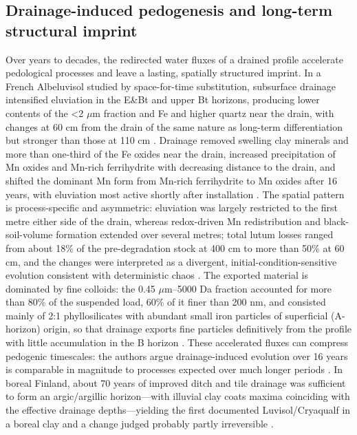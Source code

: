 \documentclass[11pt]{article}
\begin{document}
\subsection{Drainage-induced pedogenesis and long-term structural imprint}

Over years to decades, the redirected water fluxes of a drained profile accelerate
pedological processes and leave a lasting, spatially structured imprint. In a French
Albeluvisol studied by space-for-time substitution, subsurface drainage intensified
eluviation in the E\&Bt and upper Bt horizons, producing lower contents of the
\textless 2 $\mu$m fraction and Fe and higher quartz near the drain, with changes at
60 cm from the drain of the same nature as long-term differentiation but stronger than
those at 110 cm \parencite{Montagne2010}. Drainage removed swelling clay minerals and
more than one-third of the Fe oxides near the drain, increased precipitation of Mn
oxides and Mn-rich ferrihydrite with decreasing distance to the drain, and shifted the
dominant Mn form from Mn-rich ferrihydrite to Mn oxides after 16 years, with
eluviation most active shortly after installation \parencite{Montagne2008}. The
spatial pattern is process-specific and asymmetric: eluviation was largely restricted
to the first metre either side of the drain, whereas redox-driven Mn redistribution
and black-soil-volume formation extended over several metres; total lutum losses
ranged from about 18\% of the pre-degradation stock at 400 cm to more than 50\% at 60
cm, and the changes were interpreted as a divergent, initial-condition-sensitive
evolution consistent with deterministic chaos
\parencite{Montagne2013,Montagne2009}. The exported material is dominated by fine
colloids: the 0.45 $\mu$m--5000 Da fraction accounted for more than 80\% of the
suspended load, 60\% of it finer than 200 nm, and consisted mainly of 2:1
phyllosilicates with abundant small iron particles of superficial (A-horizon) origin,
so that drainage exports fine particles definitively from the profile with little
accumulation in the B horizon \parencite{Mercier2000}. These accelerated fluxes can
compress pedogenic timescales: the authors argue drainage-induced evolution over 16
years is comparable in magnitude to processes expected over much longer periods
\parencite{Montagne2010,Montagne2008}. In boreal Finland, about 70 years of improved
ditch and tile drainage was sufficient to form an argic/argillic horizon---with
illuvial clay coats maxima coinciding with the effective drainage depths---yielding
the first documented Luvisol/Cryaqualf in a boreal clay and a change judged probably
partly irreversible \parencite{YliHalla2009}.
\end{document}
